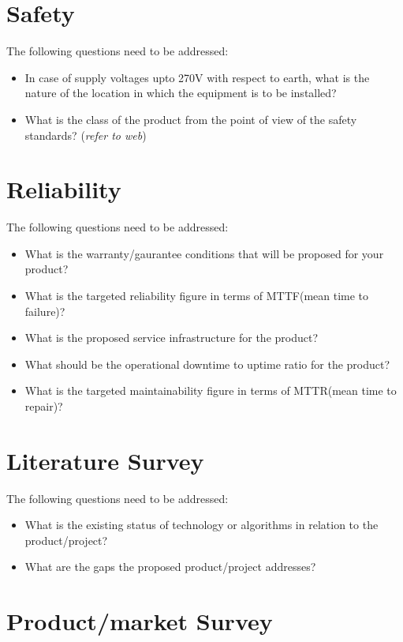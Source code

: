 \section{Safety}

The following questions need to be addressed:
\begin{itemize}
\item In case of supply voltages upto 270V with respect to earth, what is
the nature of the location in which the equipment is to be installed?
\item What is the class of the product from the point of view of the safety
standards? (\emph{refer to web})
\end{itemize}

\section{Reliability}

The following questions need to be addressed:
\begin{itemize}
\item What is the warranty/gaurantee conditions that will be proposed for
your product?
\item What is the targeted reliability figure in terms of MTTF(mean time
to failure)?
\item What is the proposed service infrastructure for the product?
\item What should be the operational downtime to uptime ratio for the product?
\item What is the targeted maintainability figure in terms of MTTR(mean
time to repair)?
\end{itemize}

\section{Literature Survey}

The following questions need to be addressed:
\begin{itemize}
\item What is the existing status of technology or algorithms in relation
to the product/project?
\item What are the gaps the proposed product/project addresses?
\end{itemize}

\section{Product/market Survey}

